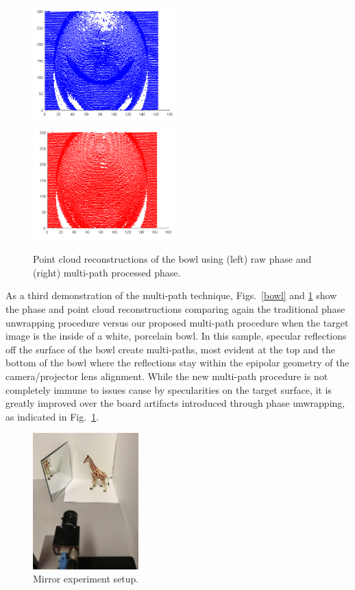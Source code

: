 \documentclass[10pt]{article}
\begin{document}
\begin{figure}
	\centering\includegraphics[width=2.20in]{Figures/bowlbefore}
	\centering\includegraphics[width=2.20in]{Figures/bowlafter}
	\caption{Point cloud reconstructions of the bowl using (left) raw phase and (right) multi-path processed phase.}
	\label{bowlresu}
\end{figure}
\clearpage
As a third demonstration of the multi-path technique, Figs.~\ref{bowl} and \ref{bowlresu} show the phase and point cloud reconstructions comparing again the traditional phase unwrapping procedure versus our proposed multi-path procedure when the target image is the inside of a white, porcelain bowl.  In this sample, specular reflections off the surface of the bowl create multi-paths, most evident at the top and the bottom of the bowl where the reflections stay within the epipolar geometry of the camera/projector lens alignment.  While the new multi-path procedure is not completely immune to issues cause by specularities on the target surface, it is greatly improved over the board artifacts introduced through phase unwrapping, as indicated  in Fig.~\ref{bowlresu}.

\begin{figure}[t]
	\centering\includegraphics[width=1.60in]{Figures/mirror}
	\caption{Mirror experiment setup.}
	\label{mirror}
\end{figure}
\end{document}
